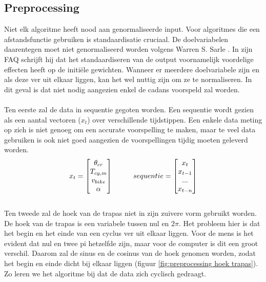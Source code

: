 \subsection*{Preprocessing}
Niet elk algoritme heeft nood aan genormaliseerde input. Voor algoritmes die een afstandsfunctie gebruiken is standaardisatie cruciaal. De doelvariabelen daarentegen moet niet genormaliseerd worden volgens Warren S. Sarle \cite{preprocessing faq}. In zijn FAQ schrijft hij dat het standaardiseren van de output voornamelijk voordelige effecten heeft op de initiële gewichten. Wanneer er meerdere doelvariabele zijn en als deze ver uit elkaar liggen, kan het wel nuttig zijn om ze te normaliseren. In dit geval is dat niet nodig aangezien enkel de cadans voorspeld zal worden.
\\\\
\noindent Ten eerste zal de data in sequentie gegoten worden. Een sequentie wordt gezien als een aantal vectoren ($x_t$) over verschillende tijdstippen. Een enkele data meting op zich is niet genoeg om een accurate voorspelling te maken, maar te veel data gebruiken is ook niet goed aangezien de voorspellingen tijdig moeten geleverd worden.
\\
\begin{gather*}
x_t = \begin{bmatrix} 
       \theta _{cr} \\ T_{cy,m} \\ v_{bike} \\ \alpha
     \end{bmatrix} \hspace*{1cm}
sequentie = \begin{bmatrix} 
       x_t \\ x_{t-1} \\ ... \\ x_{t-n}
     \end{bmatrix} 
\end{gather*}
\\
\noindent Ten tweede zal de hoek van de trapas niet in zijn zuivere vorm gebruikt worden. De hoek van de trapas is een variabele tussen nul en $2 \pi$. Het probleem hier is dat het begin en het einde van een cyclus ver uit elkaar liggen. Voor de mens is het evident dat nul en twee pi hetzelfde zijn, maar voor de computer is dit een groot verschil. Daarom zal de sinus en de cosinus van de hoek genomen worden, zodat het begin en einde dicht bij elkaar liggen (figuur \ref{fig:preprocessing hoek trapas}). Zo leren we het algoritme bij dat de data zich cyclisch gedraagt.

